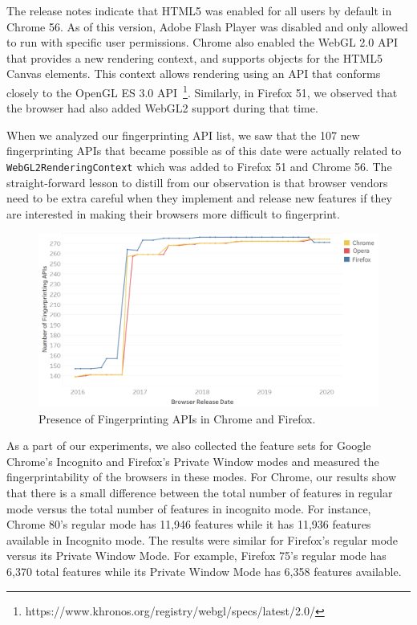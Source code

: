 The release notes indicate that HTML5 was enabled for all users by
default in Chrome 56. As of this version, Adobe Flash Player was
disabled and only allowed to run with specific user permissions.
Chrome also enabled the WebGL 2.0 API that provides a new rendering
context, and supports objects for the HTML5 Canvas elements. This
context allows rendering using an API that conforms closely to the
OpenGL ES 3.0
API~\footnote{https://www.khronos.org/registry/webgl/specs/latest/2.0/}.
Similarly, in Firefox 51, we observed that the browser had also added
WebGL2 support during that time.

When we analyzed our fingerprinting API list, we saw that the 107 new
fingerprinting APIs that became possible as of this date were actually
related to \texttt{WebGL2RenderingContext} which was added to Firefox
51 and Chrome 56. The straight-forward lesson to distill from our
observation is that browser vendors need to be extra careful when they
implement and release new features if they are interested in making
their browsers more difficult to fingerprint.

\begin{figure}[ht]
    \centering
    \includegraphics[width=\columnwidth]{figures/Fingerprinting-APIs.png}
    \caption{Presence of Fingerprinting APIs in Chrome and Firefox.}
    \label{fig:fingerprint-apis}
\end{figure}

As a part of our experiments, we also collected the feature sets for Google
Chrome's Incognito and Firefox's Private Window modes and measured the
fingerprintability of the browsers in these modes. For Chrome, our results show
that there is a small difference between the total number of features in regular
mode versus the total number of features in incognito mode.  For instance,
Chrome 80's regular mode has 11,946 features while it has 11,936 features
available in Incognito mode. The results were similar for Firefox's regular mode
versus its Private Window Mode. For example, Firefox 75's regular mode has 6,370
total features while its Private Window Mode has 6,358 features available. 


